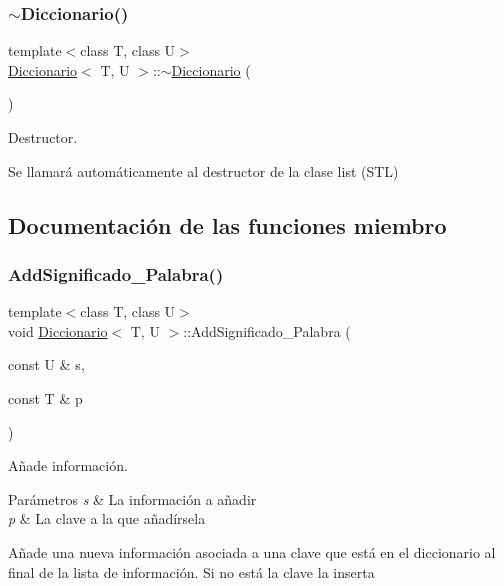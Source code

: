 \subsubsection{\texorpdfstring{$\sim$\+Diccionario()}{~Diccionario()}}
{\footnotesize\ttfamily template$<$class T, class U$>$ \\
\hyperlink{classDiccionario}{Diccionario}$<$ T, U $>$\+::$\sim$\hyperlink{classDiccionario}{Diccionario} (\begin{DoxyParamCaption}{ }\end{DoxyParamCaption})\hspace{0.3cm}{\ttfamily [inline]}}



Destructor. 

Se llamará automáticamente al destructor de la clase list (S\+TL) 

\subsection{Documentación de las funciones miembro}
\mbox{\label{classDiccionario_a7e167da231bff610001df3c20cc9b7a7}} 
\subsubsection{\texorpdfstring{Add\+Significado\+\_\+\+Palabra()}{AddSignificado\_Palabra()}}
{\footnotesize\ttfamily template$<$class T, class U$>$ \\
void \hyperlink{classDiccionario}{Diccionario}$<$ T, U $>$\+::Add\+Significado\+\_\+\+Palabra (\begin{DoxyParamCaption}\item[{const U \&}]{s,  }\item[{const T \&}]{p }\end{DoxyParamCaption})\hspace{0.3cm}{\ttfamily [inline]}}



Añade información. 


\begin{DoxyParams}{Parámetros}
{\em s} & La información a añadir \\
\hline
{\em p} & La clave a la que añadírsela\\
\hline
\end{DoxyParams}
Añade una nueva información asociada a una clave que está en el diccionario al final de la lista de información. Si no está la clave la inserta \mbox{\label{classDiccionario_aa17ce3d7317d78f5927ae7c0564089cc}} 
